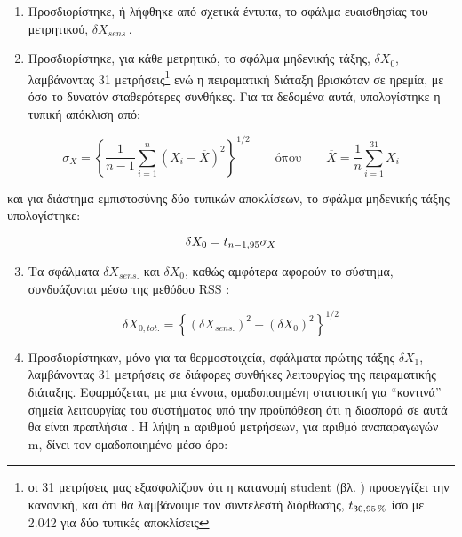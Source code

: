 \begin{enumerate}
\item Προσδιορίστηκε, ή λήφθηκε από σχετικά έντυπα, το σφάλμα ευαισθησίας του μετρητικού, $\delta X_{sens.}$.
\item Προσδιορίστηκε, για κάθε μετρητικό, το σφάλμα μηδενικής τάξης, $\delta X_{0}$, λαμβάνοντας 31 μετρήσεις\footnote{οι 31 μετρήσεις μας εξασφαλίζουν ότι η κατανομή student (βλ. ) προσεγγίζει την κανονική, και ότι θα λαμβάνουμε τον συντελεστή διόρθωσης, $t_{\scriptsize{30, \qty{95}{\percent}}}$ ίσο με 2.042 για δύο τυπικές αποκλίσεις} ενώ η πειραματική διάταξη βρισκόταν σε ηρεμία, με όσο το δυνατόν σταθερότερες συνθήκες. Για τα δεδομένα αυτά, υπολογίστηκε η τυπική απόκλιση από:
\end{enumerate}

\begin{equation*}
\sigma _X = \left\{\displaystyle\frac{1}{n - 1}\sum_{i=1}^{n} \left(X_{i} - \overline{X}\right) ^ 2\right\} ^ {1/2} \qquad \text{όπου} \qquad \overline{X} = \displaystyle\frac{1}{n}\sum_{i=1}^{31} X_{i} 
\end{equation*}

\noindent και για διάστημα εμπιστοσύνης δύο τυπικών αποκλίσεων, το σφάλμα μηδενικής τάξης υπολογίστηκε:

\begin{equation*}
\delta X_{0} = t_{\scriptsize{n-1,95}} \sigma _X
\end{equation*}

\begin{enumerate}\setcounter{enumi}{2}
\item Τα σφάλματα $\delta X_{sens.}$ και $\delta X_{0}$, καθώς αμφότερα αφορούν το σύστημα, συνδυάζονται μέσω της μεθόδου RSS \cite{2021_Moffat_BOOK}:
\end{enumerate}

\begin{equation*}
\delta X_{0, tot.} = \left\{\left(\delta X_{sens.}\right) ^ 2 + \left(\delta X_{0}\right) ^ 2 \right\} ^ {1/2}
\end{equation*}

\begin{enumerate}\setcounter{enumi}{3}
\item Προσδιορίστηκαν, μόνο για τα θερμοστοιχεία, σφάλματα πρώτης τάξης $\delta X_1$, λαμβάνοντας 31 μετρήσεις σε διάφορες συνθήκες λειτουργίας της πειραματικής διάταξης. Εφαρμόζεται, με μια έννοια, ομαδοποιημένη στατιστική για \enquote{κοντινά} σημεία λειτουργίας του συστήματος υπό την προϋπόθεση ότι η διασπορά σε αυτά θα είναι πραπλήσια \parencites{1973_Abernathy_TECH_REPORT}{2021_Moffat_BOOK}. Η λήψη n αριθμού μετρήσεων, για αριθμό αναπαραγωγών m, δίνει τον ομαδοποιημένο μέσο όρο\parencites{2021_Moffat_BOOK}{2011_Figliola_BOOK}: 
\end{enumerate}

